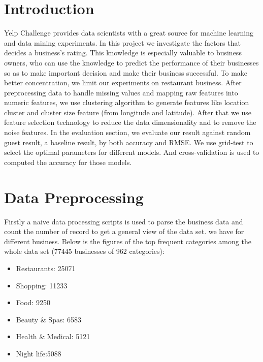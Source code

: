 \documentclass{article}
\begin{document}
 


\section{Introduction}

Yelp Challenge provides data scientists with a great source for machine learning and data mining experiments. In this project we investigate the factors that decides a business's rating. This knowledge is especially valuable to business owners, who can use the knowledge to predict the performance of their businesses so as to make important decision and make their business successful. To make better concentration, we limit our experiments on restaurant business.  After preprocessing data to handle missing values and mapping raw features into numeric features, we use clustering algorithm to generate features like location cluster and cluster size feature (from longitude and latitude). After that we use feature selection technology to reduce the data dimensionality and to remove the noise features. In the evaluation section, we evaluate our result against random guest result, a baseline result, by both accuracy and RMSE. We use grid-test to select the optimal parameters for different models. And cross-validation is used to computed the accuracy for those models.  


\section{Data Preprocessing}

Firstly a naive data processing scripts is used to parse the business data and count the number of record to get a general view of the data set. we have for different business. Below is the figures of the top frequent categories among the whole data set (77445 businesses of 962 categories):
\begin{itemize}
\item Restaurants: 25071
\item Shopping: 11233
\item Food: 9250
\item Beauty \& Spas: 6583
\item Health \& Medical: 5121
\item Night life:5088
\end{itemize}
\end{document}
